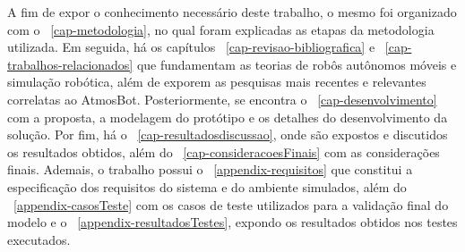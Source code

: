 A fim de expor o conhecimento necessário deste trabalho, o mesmo foi organizado com o \chapterautorefname~\ref{cap-metodologia}, no qual foram explicadas as etapas da metodologia utilizada. Em seguida, há os capítulos \chapterautorefname~\ref{cap-revisao-bibliografica} e \chapterautorefname~\ref{cap-trabalhos-relacionados} que fundamentam as teorias de robôs autônomos móveis e simulação robótica, além de exporem as pesquisas mais recentes e relevantes correlatas ao AtmosBot.  Posteriormente, se encontra o \chapterautorefname~\ref{cap-desenvolvimento} com a proposta, a modelagem do protótipo e os detalhes do desenvolvimento da solução. Por fim, há o \chapterautorefname~\ref{cap-resultadosdiscussao}, onde são expostos e discutidos os resultados obtidos, além do \chapterautorefname~\ref{cap-consideracoesFinais} com as considerações finais.
Ademais, o trabalho possui o \appendixautorefname~\ref{appendix-requisitos} que constitui a especificação dos requisitos do sistema e do ambiente simulados, além do \appendixautorefname~\ref{appendix-casosTeste} com os casos de teste utilizados para a validação final do modelo e o \appendixautorefname~\ref{appendix-resultadosTestes}, expondo os resultados obtidos nos testes executados. 
